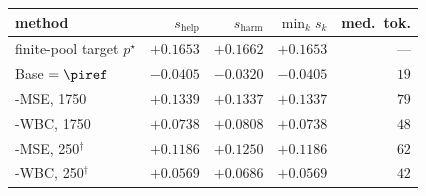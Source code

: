\begin{tabular}{lrrrr}
\toprule
method & $s_{\mathrm{help}}$ & $s_{\mathrm{harm}}$ & $\min_k s_k$ & med.\ tok.\\
\midrule
finite-pool target $p^\star$ & $+0.1653$ & $+0.1662$ & $+0.1653$ & --- \\
\midrule
Base $=\piref$ & $-0.0405$ & $-0.0320$ & $-0.0405$ & $19$\\
\NBPO{}-MSE, 1750 & $+0.1339$ & $+0.1337$ & $+0.1337$ & $79$\\
\NBPO{}-WBC, 1750 & $+0.0738$ & $+0.0808$ & $+0.0738$ & $48$\\
\NBPO{}-MSE, 250$^{\dagger}$ & $+0.1186$ & $+0.1250$ & $+0.1186$ & $62$\\
\NBPO{}-WBC, 250$^{\dagger}$ & $+0.0569$ & $+0.0686$ & $+0.0569$ & $42$\\
\bottomrule
\end{tabular}
